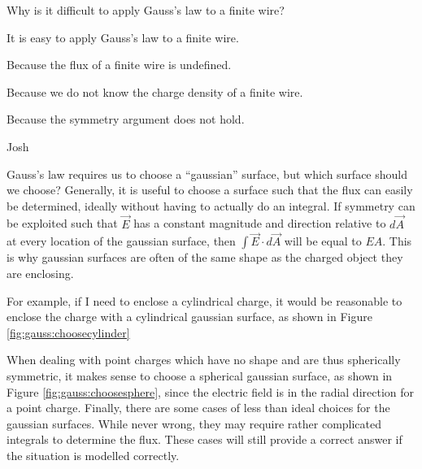 \begin{checkpoint}\label{cp:gauss:gausswire}
	\begin{MCquestion}{Why is it difficult to apply Gauss's law to a finite wire?}
		\item It is easy to apply Gauss's law to a finite wire.
		\item Because the flux of a finite wire is undefined.
		\item Because we do not know the charge density of a finite wire.
		\item Because the symmetry argument does not hold. \correct
	\end{MCquestion}
\end{checkpoint}
\vspace{-0.25cm}
\begin{studentOpinion}{Josh}
	
Gauss's law requires us to choose a ``gaussian'' surface, but which surface should we choose? Generally, it is useful to choose a surface such that the flux can easily be determined, ideally without having to actually do an integral. If symmetry can be exploited such that $\vec E$ has a constant magnitude and direction relative to $d\vec A$ at every location of the gaussian surface, then $\int \vec E \cdot d\vec A$ will be equal to $E A$. This is why gaussian surfaces are often of the same shape as the charged object they are enclosing.
	
For example, if I need to enclose a cylindrical charge, it would be reasonable to enclose the charge with a cylindrical gaussian surface, as shown in Figure \ref{fig:gauss:choosecylinder}
	
When dealing with point charges which have no shape and are thus spherically symmetric, it makes sense to choose a spherical gaussian surface, as shown in Figure \ref{fig:gauss:choosesphere}, since the electric field is in the radial direction for a point charge.
Finally, there are some cases of less than ideal choices for the gaussian surfaces. While never wrong, they may require rather complicated integrals to determine the flux. These cases will still provide a correct answer if the situation is modelled correctly.


\end{studentOpinion}
